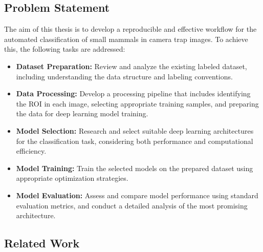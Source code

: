\subsection{Problem Statement}

The aim of this thesis is to develop a reproducible and effective workflow for the automated classification of small mammals in camera trap images. To achieve this, the following tasks are addressed:

\begin{itemize}
    \item \textbf{Dataset Preparation:} Review and analyze the existing labeled dataset, including understanding the data structure and labeling conventions.
    
    \item \textbf{Data Processing:} Develop a processing pipeline that includes identifying the \ac{ROI} in each image, selecting appropriate training samples, and preparing the data for deep learning model training.
    
    \item \textbf{Model Selection:} Research and select suitable deep learning architectures for the classification task, considering both performance and computational efficiency.
    
    \item \textbf{Model Training:} Train the selected models on the prepared dataset using appropriate optimization strategies.
    
    \item \textbf{Model Evaluation:} Assess and compare model performance using standard evaluation metrics, and conduct a detailed analysis of the most promising architecture.
\end{itemize}


\subsection{Related Work}






